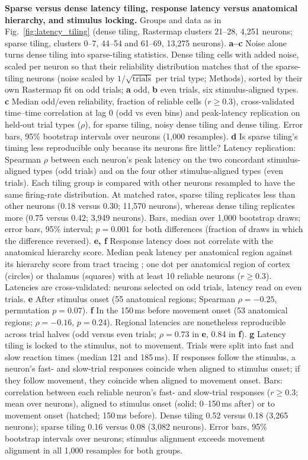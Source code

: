 \caption{\textbf{Sparse versus dense latency tiling, response latency versus anatomical hierarchy, and stimulus locking.} Groups and data as in Fig.~\ref{fig:latency_tiling} (dense tiling, Rastermap clusters 21--28, 4,251 neurons; sparse tiling, clusters 0--7, 44--54 and 61--69, 13,275 neurons).
\textbf{a--c} Noise alone turns dense tiling into sparse-tiling statistics. Dense tiling cells with added noise, scaled per neuron so that their reliability distribution matches that of the sparse-tiling neurons (noise scaled by $1/\sqrt{\text{trials}}$ per trial type; Methods), sorted by their own Rastermap fit on odd trials; \textbf{a} odd, \textbf{b} even trials, six stimulus-aligned types. \textbf{c} Median odd/even reliability, fraction of reliable cells ($r\geq0.3$), cross-validated time--time correlation at lag 0 (odd vs even bins) and peak-latency replication on held-out trial types ($\rho$), for sparse tiling, noisy dense tiling and dense tiling. Error bars, 95\% bootstrap intervals over neurons (1,000 resamples).
\textbf{d} Is sparse tiling's timing less reproducible only because its neurons fire little? Latency replication: Spearman $\rho$ between each neuron's peak latency on the two concordant stimulus-aligned types (odd trials) and on the four other stimulus-aligned types (even trials). Each tiling group is compared with other neurons resampled to have the same firing-rate distribution. At matched rates, sparse tiling replicates less than other neurons (0.18 versus 0.30; 11,570 neurons), whereas dense tiling replicates more (0.75 versus 0.42; 3,949 neurons). Bars, median over 1,000 bootstrap draws; error bars, 95\% interval; $p=0.001$ for both differences (fraction of draws in which the difference reversed).
\textbf{e, f} Response latency does not correlate with the anatomical hierarchy score. Median peak latency per anatomical region against its hierarchy score from tract tracing \cite{harris2019hierarchical}; one dot per anatomical region of cortex (circles) or thalamus (squares) with at least 10 reliable neurons ($r\geq0.3$). Latencies are cross-validated: neurons selected on odd trials, latency read on even trials. \textbf{e} After stimulus onset (55 anatomical regions; Spearman $\rho=-0.25$, permutation $p=0.07$). \textbf{f} In the 150\,ms before movement onset (53 anatomical regions; $\rho=-0.16$, $p=0.24$). Regional latencies are nonetheless reproducible across trial halves (odd versus even trials; $\rho=0.73$ in \textbf{e}, 0.84 in \textbf{f}). \textbf{g} Latency tiling is locked to the stimulus, not to movement. Trials were split into fast and slow reaction times (median 121 and 185\,ms). If responses follow the stimulus, a neuron's fast- and slow-trial responses coincide when aligned to stimulus onset; if they follow movement, they coincide when aligned to movement onset. Bars: correlation between each reliable neuron's fast- and slow-trial responses ($r\geq0.3$; mean over neurons), aligned to stimulus onset (solid; 0--150\,ms after) or to movement onset (hatched; 150\,ms before). Dense tiling 0.52 versus 0.18 (3,265 neurons); sparse tiling 0.16 versus 0.08 (3,082 neurons). Error bars, 95\% bootstrap intervals over neurons; stimulus alignment exceeds movement alignment in all 1,000 resamples for both groups.}
\label{fig:latency_tiling_controls}
